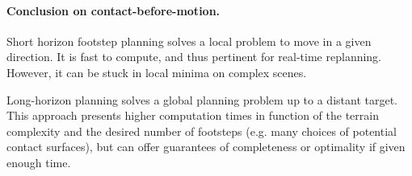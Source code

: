 
\paragraph{Conclusion on contact-before-motion.}
Short horizon footstep planning solves a local problem to move in a given direction. It is fast to compute, and thus pertinent for real-time replanning. However, it can be stuck in local minima on complex scenes.

Long-horizon planning solves a global planning problem up to a distant target. This approach presents higher computation times in function of the terrain complexity and the desired number of footsteps (e.g. many choices of potential contact surfaces), but can offer guarantees of completeness or optimality if given enough time.


